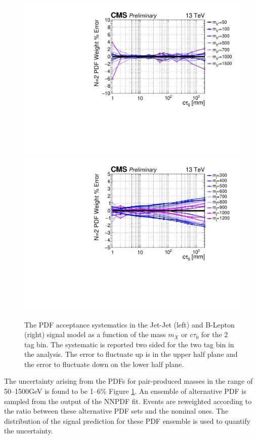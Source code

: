 \begin{figure}
\begin{center}
\includegraphics[width=.70\textwidth]{figures/an/SYSTEMATICS/76x_pu/sys_2tag_pdf.pdf}
\includegraphics[width=.70\textwidth]{figures/an/SYSTEMATICS/76x_pu/sys_2tag_pdf_dsusy.pdf}
\caption{The PDF acceptance  systematics in the Jet-Jet (left)
 and B-Lepton (right) signal model as a function of the mass $m_X$ 
or $c\tau_0$ for the 2 tag bin. The systematic is reported two sided 
for the two tag bin in the analysis. The error to fluctuate up is in
 the upper half plane and the error to fluctuate down on the lower half plane.  \label{fig:pdf_sys}}
\end{center}
\end{figure}

The uncertainty arising from the PDFs for pair-produced masses in the
range of 50--1500GeV is found to be 1--6\% Figure \ref{fig:pdf_sys}.  An ensemble of
alternative PDF is sampled from the output of the NNPDF fit.  Events
are reweighted according to the ratio between these alternative PDF
sets and the nominal ones. The distribution of the signal prediction
for these PDF ensemble is used to quantify the uncertainty.

